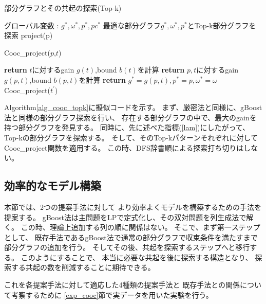 \begin{algorithm}
  \small 
\caption{部分グラフとその共起の探索(Top-k)}\label{alg_cooc_topk}
\begin{algorithmic}[1]
\State グローバル変数 : $g^*,\omega^*,p^*,pc^*$
\State 最適な部分グラフ$g^*,\omega^*,p^*$とTop-k部分グラフを探索 
\State project(p)
\EndFor
\EndProcedure

\State Cooc\_project($p$,$t$)
\EndFor
\EndFunction

\State \textbf{return}
\EndIf
\State $t$に対するgain $g(t)$,bound $b(t)$を計算
\State \textbf{return}
\EndIf
\State $p,t$に対するgain $g(p,t)$,bound $b(p,t)$を計算
\State \textbf{return}
\EndIf
{}
\State $g^* = g(p,t),p^* = p,\omega^* = \omega$
\EndIf
{}
\State Cooc\_project($t^{\prime}$)
\EndFor
\EndFunction
\end{algorithmic}
\end{algorithm}

Algorithm\ref{alg_cooc_topk}に擬似コードを示す。
まず、厳密法と同様に、gBoost法と同様の部分グラフ探索を行い、
存在する部分グラフの中で、最大のgainを持つ部分グラフを発見する。
同時に、先に述べた指標(\ref{lam})にしたがって、Top-kの部分グラフを探索する。
そして、そのTop-kパターンそれぞれに対してCooc\_project関数を適用する。
この時、DFS辞書順による探索打ち切りはしない。

\subsection{効率的なモデル構築}

本節では、2つの提案手法に対して
より効率よくモデルを構築するための手法を提案する。
gBoost法は主問題をLPで定式化し、その双対問題を列生成法で解く。
この時、理論上追加する列の順に関係はない。
そこで、まず第一ステップとして、
既存手法であるgBoost法で通常の部分グラフで収束条件を満たすまで
部分グラフの追加を行う。
そしてその後、共起を探索するステップへと移行する。
このようにすることで、
本当に必要な共起を後に探索する構造となり、
探索する共起の数を削減することに期待できる。

これを各提案手法に対して適応した4種類の提案手法と
既存手法との関係について考察するために
\ref{exp_cooc}節で実データを用いた実験を行う。

